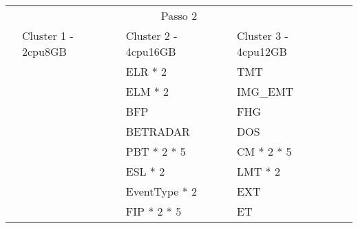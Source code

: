 \begin{table}[H]
  \centering
  \small
  \setlength{\extrarowheight}{3pt}
  \setlength{\arrayrulewidth}{1pt}
  
  \begin{tabular}{|l|l|l|l|l|}
    \hline
    \cellcolor{white} & \multicolumn{3}{|c|}{\cellcolor[HTML]{FBE6A3}Passo 2} & \cellcolor{white}              \\ \cline{2-5} 
                                     & \cellcolor[HTML]{4EAC5B}Cluster 1 - 2cpu8GB & \cellcolor[HTML]{4EAC5B}Cluster 2 - 4cpu16GB & \cellcolor[HTML]{4EAC5B}Cluster 3 - 4cpu12GB &                              \\ \cline{3-4}
                                     &                                             & \cellcolor[HTML]{A9D08E}ELR * 2              & \cellcolor[HTML]{BDD7EE}TMT                  &                              \\ \cline{3-4}
                                     &                                             & \cellcolor[HTML]{A9D08E}ELM * 2              & \cellcolor[HTML]{BDD7EE}IMG\_EMT             &                              \\ \cline{3-4}
                                     &                                             & \cellcolor[HTML]{A9D08E}BFP                  & \cellcolor[HTML]{BDD7EE}FHG                  &                              \\ \cline{3-4}
                                     &                                             & \cellcolor[HTML]{A9D08E}BETRADAR             & \cellcolor[HTML]{BDD7EE}DOS                  &                              \\ \cline{3-4}
                                     &                                             & \cellcolor[HTML]{A9D08E}PBT * 2 * 5          & \cellcolor[HTML]{BDD7EE}CM * 2 * 5           &                              \\ \cline{3-4}
                                     &                                             & \cellcolor[HTML]{A9D08E}ESL * 2              & \cellcolor[HTML]{BDD7EE}LMT * 2              &                              \\ \cline{3-4}
                                     &                                             & \cellcolor[HTML]{A9D08E}EventType * 2        & \cellcolor[HTML]{BDD7EE}EXT                  &                              \\ \cline{3-4}
                                     &                                             & \cellcolor[HTML]{A9D08E}FIP * 2 * 5          & \cellcolor[HTML]{BDD7EE}ET                   &                              \\ \cline{3-4}

\end{tabular}
\end{table}

